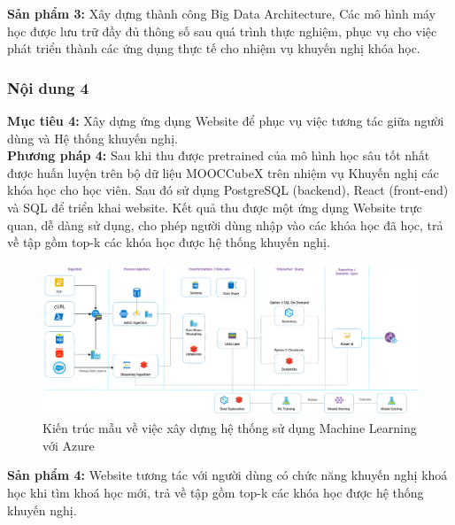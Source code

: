 \textbf{Sản phẩm 3:} Xây dựng thành công Big Data Architecture, Các mô hình máy học được lưu trữ đầy đủ thông số sau quá trình thực nghiệm, phục vụ cho việc phát triển thành các ứng dụng thực tế cho nhiệm vụ khuyến nghị khóa học.
\subsubsection{Nội dung 4}
\textbf{Mục tiêu 4:} Xây dựng ứng dụng Website để phục vụ việc tương tác giữa người
dùng và Hệ thống khuyến nghị.\\
\textbf{Phương pháp 4:} Sau khi thu được pretrained của mô hình học sâu tốt nhất được huấn luyện trên bộ dữ liệu MOOCCubeX trên nhiệm vụ Khuyến nghị các khóa học cho học viên. Sau đó sử dụng PostgreSQL (backend), React (front-end) và SQL để triển khai website. Kết quả thu được một ứng dụng Website trực quan, dễ dàng sử dụng, cho phép người dùng nhập vào các khóa học đã học, trả về tập gồm top-k các khóa học được hệ thống khuyến nghị.\\
\begin{figure}[H]
    \centering
    \includegraphics[width=0.75\linewidth]{figures/56.png}
    \caption{Kiến trúc mẫu về việc xây dựng hệ thống sử dụng Machine Learning với Azure}
\end{figure}
\textbf{Sản phẩm 4:} Website tương tác với người dùng có chức năng khuyến nghị khoá học khi tìm khoá học mới, trả về tập gồm top-k các khóa học được hệ thống khuyến nghị.
